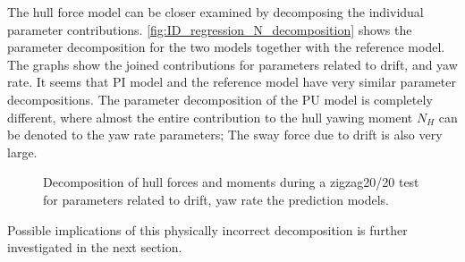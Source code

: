 \FloatBarrier
The hull force model can be closer examined by decomposing the individual parameter contributions. \autoref{fig:ID_regression_N_decomposition} shows the parameter decomposition for the two models together with the reference model. The graphs show the joined contributions for parameters related to drift, and yaw rate. It seems that PI model and the reference model have very similar parameter decompositions.
The parameter decomposition of the PU model is completely different, where almost the entire contribution to the hull yawing moment $N_H$ can be denoted to the yaw rate parameters; The sway force due to drift is also very large.  
\begin{figure}[h]
    \begin{center}
        
        \caption{Decomposition of hull forces and moments during a zigzag20/20 test for parameters related to drift, yaw rate the prediction models.}
        \label{fig:ID_regression_N_decomposition}
    \end{center}
\end{figure}
Possible implications of this physically incorrect decomposition is further investigated in the next section.